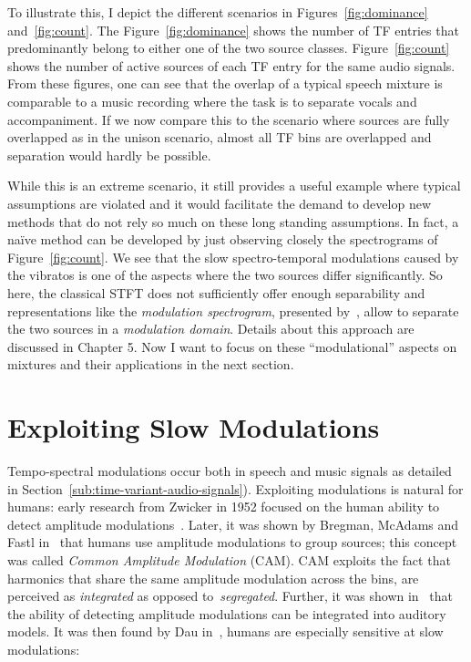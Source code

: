To illustrate this, I depict the different scenarios in Figures~\ref{fig:dominance} and~\ref{fig:count}.
The Figure~\ref{fig:dominance} shows the number of TF entries that predominantly belong to either one of the two source classes.
Figure~\ref{fig:count} shows the number of active sources of each TF entry for the same audio signals.
From these figures, one can see that the overlap of a typical speech mixture is comparable to a music recording where the task is to separate vocals and accompaniment.
If we now compare this to the scenario where sources are fully overlapped as in the unison scenario, almost all TF bins are overlapped and separation would hardly be possible.
\par
While this is an extreme scenario, it still provides a useful example where typical assumptions are violated and it would facilitate the demand to develop new methods that do not rely so much on these long standing assumptions.
In fact, a naïve method can be developed by just observing closely the spectrograms of Figure~\ref{fig:count}.
We see that the slow spectro-temporal modulations caused by the vibratos is one of the aspects where the two sources differ significantly.
So here, the classical STFT does not sufficiently offer enough separability and representations like the \emph{modulation spectrogram}, presented by~\cite{greenberg96}, allow to separate the two sources in a \emph{modulation domain}.
Details about this approach are discussed in Chapter 5.
Now I want to focus on these ``modulational'' aspects on mixtures and their applications in the next section.

\hypertarget{exploiting-slow-modulations}{%
\section{Exploiting Slow Modulations}\label{exploiting-slow-modulations}}

Tempo-spectral modulations occur both in speech and music signals as detailed in Section~\ref{sub:time-variant-audio-signals}).
Exploiting modulations is natural for humans: early research from Zwicker in 1952 focused on the human ability to detect amplitude modulations~\cite{zwicker52}. 
Later, it was shown by Bregman, McAdams and Fastl in~\cite{mcadams89, bregman90, fastl90} that humans use amplitude modulations to group sources; this concept was called \emph{Common Amplitude Modulation} (CAM).
CAM exploits the fact that harmonics that share the same amplitude modulation across the bins, are perceived as \emph{integrated} as opposed to~\emph{segregated}.
Further, it was shown in~\cite{bacon89} that the ability of detecting amplitude modulations can be integrated into auditory models.
It was then found by Dau in~\cite{dau99}, humans are especially sensitive at slow modulations:

